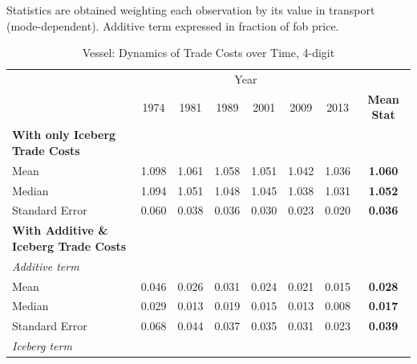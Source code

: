 \documentclass[a4paper,11pt]{article}
\begin{document}
\begin{table}[htbp]
\begin{center}
\begin{tabular}{lccccccc}
\hline\hline
    \end{tabular}%
  \end{center}
  \label{tab:result_air_rob}%
\tiny{Statistics are obtained weighting each observation by its value in transport (mode-dependent). Additive term expressed in fraction of fob price. }
\end{table}%


\begin{table}[htbp]
\def\sym#1{\ifmmode^{#1}\else\(^{#1}\)\fi}
  \centering
\caption{Vessel: Dynamics of Trade Costs over Time, 4-digit}
\begin{center}
    \begin{tabular}{lccccccc}
   \hline\hline
          & \multicolumn{6}{c}{Year}                      &  \\
& 1974  & 1981  & 1989  & 2001  & 2009  & 2013  & \textbf{Mean Stat}\\
\hline
\textbf{With only Iceberg Trade Costs} &       &       &       &       &       &       & \textbf{} \\
Mean  & 1.098 & 1.061 & \multicolumn{1}{c}{1.058} & \multicolumn{1}{c}{1.051} & \multicolumn{1}{c}{1.042} & \multicolumn{1}{c}{1.036} & \textbf{1.060} \\
Median & 1.094 & 1.051 & \multicolumn{1}{c}{1.048} & \multicolumn{1}{c}{1.045} & \multicolumn{1}{c}{1.038} & \multicolumn{1}{c}{1.031} & \textbf{1.052} \\
Standard Error & 0.060 & 0.038 & \multicolumn{1}{c}{0.036} & \multicolumn{1}{c}{0.030} & \multicolumn{1}{c}{0.023} & \multicolumn{1}{c}{0.020} & \textbf{0.036} \\
\hline
\textbf{With Additive \& Iceberg Trade Costs } &       &       &       &       &       &       & \textbf{}\\
\textit{Additive term} &       &       &       &       &       &       & \textbf{} \\
Mean  & 0.046 & 0.026 & \multicolumn{1}{c}{0.031} & \multicolumn{1}{c}{0.024} & \multicolumn{1}{c}{0.021} & \multicolumn{1}{c}{0.015} & \textbf{0.028} \\
Median & 0.029 & 0.013 & \multicolumn{1}{c}{0.019} & \multicolumn{1}{c}{0.015} & \multicolumn{1}{c}{0.013} & \multicolumn{1}{c}{0.008} & \textbf{0.017} \\
Standard Error & 0.068 & 0.044 & \multicolumn{1}{c}{0.037} & \multicolumn{1}{c}{0.035} & \multicolumn{1}{c}{0.031} & \multicolumn{1}{c}{0.023} & \textbf{0.039} \\
\textit{Iceberg term} &       &       &       &       &       &       & \textbf{} \\

\end{tabular}
\end{center}
\end{table}
\end{document}
